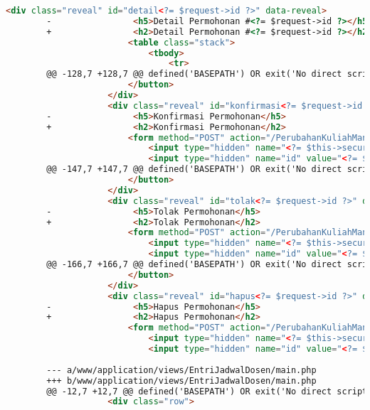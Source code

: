 \begin{itemize}
\begin{lstlisting}[frame=single, label={lst:perbaikan_1.3.1_tag_heading}, language=HTML, caption=Perbaikan Kriteria Sukses 1.3.1 - Penggunaan \textit{Heading} Tidak Tepat]
                    <div class="reveal" id="detail<?= $request->id ?>" data-reveal>
        -                <h5>Detail Permohonan #<?= $request->id ?></h5>
        +                <h2>Detail Permohonan #<?= $request->id ?></h2>
                        <table class="stack">
                            <tbody>
                                <tr>
        @@ -128,7 +128,7 @@ defined('BASEPATH') OR exit('No direct script access allowed');
                        </button>
                    </div>
                    <div class="reveal" id="konfirmasi<?= $request->id ?>" data-reveal>
        -                <h5>Konfirmasi Permohonan</h5>
        +                <h2>Konfirmasi Permohonan</h2>
                        <form method="POST" action="/PerubahanKuliahManage/answer">
                            <input type="hidden" name="<?= $this->security->get_csrf_token_name() ?>" value="<?= $this->security->get_csrf_hash() ?>" />
                            <input type="hidden" name="id" value="<?= $request->id ?>"/>
        @@ -147,7 +147,7 @@ defined('BASEPATH') OR exit('No direct script access allowed');
                        </button>
                    </div>        
                    <div class="reveal" id="tolak<?= $request->id ?>" data-reveal>
        -                <h5>Tolak Permohonan</h5>
        +                <h2>Tolak Permohonan</h2>
                        <form method="POST" action="/PerubahanKuliahManage/answer">
                            <input type="hidden" name="<?= $this->security->get_csrf_token_name() ?>" value="<?= $this->security->get_csrf_hash() ?>" />
                            <input type="hidden" name="id" value="<?= $request->id ?>"/>
        @@ -166,7 +166,7 @@ defined('BASEPATH') OR exit('No direct script access allowed');
                        </button>
                    </div>
                    <div class="reveal" id="hapus<?= $request->id ?>" data-reveal>
        -                <h5>Hapus Permohonan</h5>
        +                <h2>Hapus Permohonan</h2>
                        <form method="POST" action="/PerubahanKuliahManage/remove">
                            <input type="hidden" name="<?= $this->security->get_csrf_token_name() ?>" value="<?= $this->security->get_csrf_hash() ?>" />
                            <input type="hidden" name="id" value="<?= $request->id ?>"/>
        
        --- a/www/application/views/EntriJadwalDosen/main.php
        +++ b/www/application/views/EntriJadwalDosen/main.php
        @@ -12,7 +12,7 @@ defined('BASEPATH') OR exit('No direct script access allowed');
                    <div class="row">
            

\end{lstlisting}
\end{itemize}
